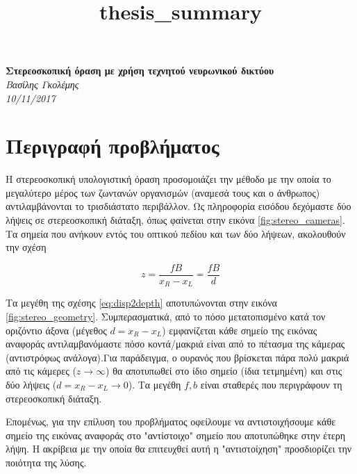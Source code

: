 \documentclass{article}
\title{thesis_summary}
\begin{document}
   \begin{center}
      \Large\textbf{Στερεοσκοπική όραση με χρήση τεχνητού νευρωνικού δικτύου}
      \\
      \vspace*{3mm}
      \large\textit{Βασίλης Γκολέμης}
      \\
      \vspace*{3mm}
      \large\textit{10/11/2017}
   \end{center}
   \vspace*{5mm}

\section{Περιγραφή προβλήματος}

Η στερεοσκοπική υπολογιστική όραση προσομοιάζει την μέθοδο με την οποία το μεγαλύτερο μέρος των ζωντανών οργανισμών (αναμεσά τους και ο άνθρωπος) αντιλαμβάνονται το τρισδιάστατο περιβάλλον. Ως πληροφορία εισόδου δεχόμαστε δύο λήψεις σε στερεοσκοπική διάταξη, όπως φαίνεται στην εικόνα \ref{fig:stereo_cameras}. Τα σημεία που ανήκουν εντός του οπτικού πεδίου και των δύο λήψεων, ακολουθούν την σχέση

\begin{equation} 
	z = \dfrac{fB}{x_R-x_L} = \dfrac{fB}{d}
    \label{eq:disp2depth}
\end{equation}

Τα μεγέθη της σχέσης \ref{eq:disp2depth} αποτυπώνονται στην εικόνα \ref{fig:stereo_geometry}. Συμπερασματικά, από το πόσο μετατοπισμένο κατά τον οριζόντιο άξονα (μέγεθος $d = x_R-x_L$) εμφανίζεται κάθε σημείο της εικόνας αναφοράς αντιλαμβανόμαστε πόσο κοντά/μακριά είναι από το πέτασμα της κάμερας (αντιστρόφως ανάλογα).Για παράδειγμα, ο ουρανός που βρίσκεται πάρα πολύ μακριά από τις κάμερες ($z \rightarrow \infty$) θα αποτυπωθεί στο ίδιο σημείο (ίδια τετμημένη) και στις δύο λήψεις ($d = x_R-x_L \rightarrow 0$). Τα μεγέθη $f,b$ είναι σταθερές που περιγράφουν τη στερεοσκοπική διάταξη.

Επομένως, για την επίλυση του προβλήματος οφείλουμε να αντιστοιχήσουμε κάθε σημείο της εικόνας αναφοράς στο "αντίστοιχο" σημείο που αποτυπώθηκε στην έτερη λήψη. Η ακρίβεια με την οποία θα επιτευχθεί αυτή η "αντιστοίχηση" προσδιορίζει την ποιότητα της λύσης.
\end{document}
